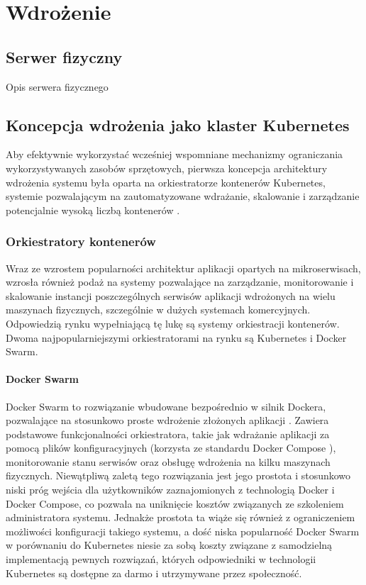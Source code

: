 \chapter{Wdrożenie}
\section{Serwer fizyczny}
Opis serwera fizycznego

\section{Koncepcja wdrożenia jako klaster Kubernetes}
Aby efektywnie wykorzystać wcześniej wspomniane mechanizmy ograniczania wykorzystywanych zasobów sprzętowych, pierwsza koncepcja architektury wdrożenia systemu była oparta na orkiestratorze kontenerów Kubernetes, systemie pozwalającym na zautomatyzowane wdrażanie, skalowanie i zarządzanie potencjalnie wysoką liczbą kontenerów \cite{k8sMain}.

\subsection{Orkiestratory kontenerów}
Wraz ze wzrostem popularności architektur aplikacji opartych na mikroserwisach, wzrosła również podaż na systemy pozwalające na zarządzanie, monitorowanie i skalowanie instancji poszczególnych serwisów aplikacji wdrożonych na wielu maszynach fizycznych, szczególnie w dużych systemach komercyjnych. Odpowiedzią rynku wypełniającą tę lukę są systemy orkiestracji kontenerów. Dwoma najpopularniejszymi orkiestratorami na rynku są Kubernetes i Docker Swarm.

\subsubsection{Docker Swarm}
Docker Swarm to rozwiązanie wbudowane bezpośrednio w silnik Dockera, pozwalające na stosunkowo proste wdrożenie złożonych aplikacji \cite{dockerSwarm}. Zawiera podstawowe funkcjonalności orkiestratora, takie jak wdrażanie aplikacji za pomocą plików konfiguracyjnych (korzysta ze standardu Docker Compose \cite{dockerCompose}), monitorowanie stanu serwisów oraz obsługę wdrożenia na kilku maszynach fizycznych. Niewątpliwą zaletą tego rozwiązania jest jego prostota i stosunkowo niski próg wejścia dla użytkowników zaznajomionych z technologią Docker i Docker Compose, co pozwala na uniknięcie kosztów związanych ze szkoleniem administratora systemu. Jednakże prostota ta wiąże się również z ograniczeniem możliwości konfiguracji takiego systemu, a dość niska popularność Docker Swarm w porównaniu do Kubernetes niesie za sobą koszty związane z samodzielną implementacją pewnych rozwiązań, których odpowiedniki w technologii Kubernetes są dostępne za darmo i utrzymywane przez społeczność.
